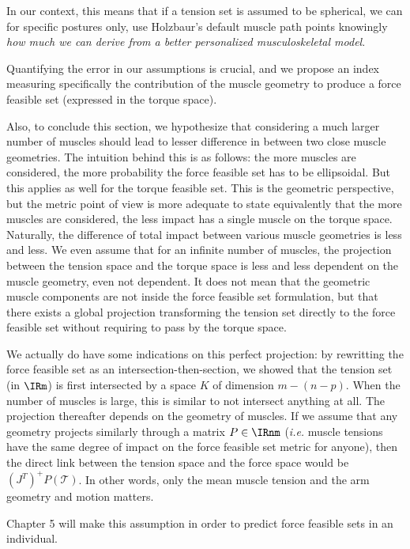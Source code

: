 In our context, this means that if a tension set is assumed to be spherical, we can for specific postures only, use Holzbaur's default muscle path points knowingly \emph{how much we can derive from a better personalized musculoskeletal model}.

Quantifying the error in our assumptions is crucial, and we propose an index measuring specifically the contribution of the muscle geometry to produce a force feasible set (expressed in the torque space).

Also, to conclude this section, we hypothesize that considering a much larger number of muscles should lead to lesser difference in between two close muscle geometries. The intuition behind this is as follows: the more muscles are considered, the more probability the force feasible set has to be ellipsoidal. But this applies as well for the torque feasible set. This is the geometric perspective, but the metric point of view is more adequate to state equivalently that the more muscles are considered, the less impact has a single muscle on the torque space. Naturally, the difference of total impact between various muscle geometries is less and less.
We even assume that for an infinite number of muscles, the projection between the tension space and the torque space is less and less dependent on the muscle geometry, even not dependent. 
It does not mean that the geometric muscle components are not inside the force feasible set formulation, but that there exists a global projection transforming the tension set directly to the force feasible set without requiring to pass by the torque space.

We actually do have some indications on this perfect projection: by rewritting the force feasible set as an intersection-then-section, we showed that the tension set (in $\IRm$) is first intersected by a space $K$ of dimension $m-(n-p)$. When the number of muscles is large, this is similar to not intersect anything at all. The projection thereafter depends on the geometry of muscles. If we assume that any geometry projects similarly through a matrix $P\in \IRnm$ (\emph{i.e.} muscle tensions have the same degree of impact on the force feasible set metric for anyone), then the direct link between the tension space and the force space would be $(J^T)^+P(\mathcal{T})$. In other words, only the mean muscle tension and the arm geometry and motion matters.

Chapter 5 will make this assumption in order to predict force feasible sets in an individual.

